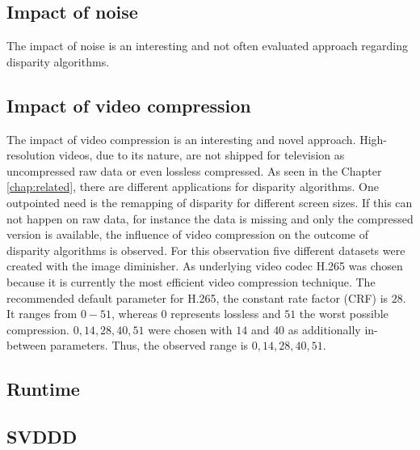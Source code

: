 \subsection{Impact of noise}

The impact of noise is an interesting and not often evaluated approach regarding disparity algorithms.

\subsection{Impact of video compression}

The impact of video compression is an interesting and novel approach.
High-resolution videos, due to its nature, are not shipped for television as uncompressed raw data or even lossless compressed.
As seen in the Chapter \ref{chap:related}, there are different applications for disparity algorithms.
One outpointed need is the remapping of disparity for different screen sizes.
If this can not happen on raw data, for instance the data is missing and only the compressed version is available, the influence of video compression on the outcome of disparity algorithms is observed.
\newline\newline\noindent For this observation five different datasets were created with the image diminisher.
As underlying video codec H.265 was chosen because it is currently the most efficient video compression technique.
The recommended default parameter for H.265, the constant rate factor (CRF) is $28$.
It ranges from $0-51$, whereas $0$ represents lossless and $51$ the worst possible compression.
$0, 14, 28, 40, 51$ were chosen with $14$ and $40$ as additionally in-between parameters.
Thus, the observed range is $0, 14, 28, 40, 51$.

\subsection{Runtime}



\subsection{SVDDD}

